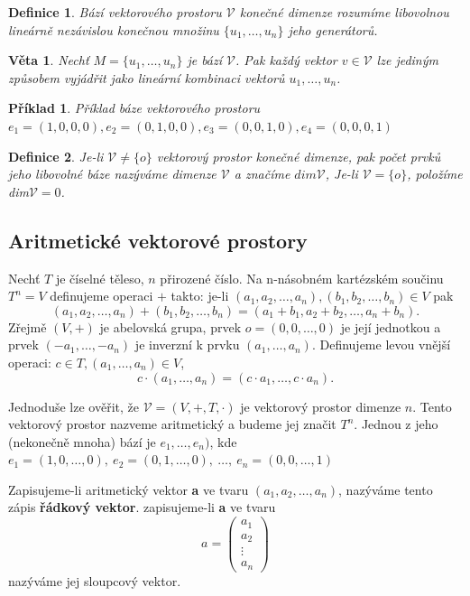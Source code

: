 \documentclass[12pt,a4paper]{article}
\newtheorem{definition}{Definice}
\newtheorem{sentence}{Věta}
\newtheorem{example}{Příklad}
\begin{document}
\begin{definition}
	Bází vektorového prostoru $\mathscr{V}$ konečné dimenze rozumíme libovolnou lineárně nezávislou konečnou množinu $\{u_1, \dots, u_n\}$ jeho generátorů.
\end{definition}

\begin{sentence}
	Nechť $M = \{u_1, \dots, u_n\}$ je bází $\mathscr{V}$. Pak každý vektor $v \in \mathscr{V}$ lze jediným způsobem vyjádřit jako lineární kombinaci vektorů $u_1, \dots, u_n$.
\end{sentence}

\begin{example}
	Příklad báze vektorového prostoru $e_1 = (1,0,0,0), e_2 = (0,1,0,0), e_3 = (0,0,1,0), e_4 = (0,0,0,1)$
\end{example}

\begin{definition}
	Je-li $\mathscr{V} \not= \{o\}$  vektorový prostor konečné dimenze, pak počet prvků jeho libovolné báze nazýváme dimenze $\mathscr{V}$ a značíme $dim\mathscr{V}$, Je-li $\mathscr{V} = \{o\}$, položíme dim$\mathscr{V} = 0$.
\end{definition}


\subsection{Aritmetické vektorové prostory}
Nechť $T$ je číselné těleso, $n$ přirozené číslo. Na n-násobném kartézském součinu $T^n = V$ definujeme operaci $+$ takto: je-li $(a_1,a_2,\dots, a_n), (b_1,b_2,\dots, b_n) \in V$ pak $$(a_1,a_2,\dots, a_n) +(b_1,b_2,\dots, b_n) = (a_1 + b_1, a_2 + b_2,\dots, a_n + b_n).$$
Zřejmě $(V, +)$ je abelovská grupa, prvek $o = (0,0, \dots, 0)$ je její jednotkou a prvek $(- a_1, \dots, - a_n)$ je inverzní k prvku $(a_1, \dots, a_n)$. Definujeme levou vnější operaci: $c \in T, (a_1, \dots, a_n) \in V$, $$c \cdot (a_1,\dots, a_n) = (c \cdot a_1,\dots,c \cdot a_n).$$

Jednoduše lze ověřit, že $\mathscr{V} = (V,+,T,\cdot)$ je vektorový prostor dimenze $n$. Tento vektorový prostor nazveme aritmetický a budeme jej značit $T^n$. Jednou z jeho (nekonečně mnoha) bází je $e_1, \dots, e_n)$, kde $e_1 = (1,0,\dots, 0),\ e_2 = (0,1,\dots, 0),\ \dots, \ e_n = (0,0,\dots, 1)$ 

Zapisujeme-li aritmetický vektor \textbf{a} ve tvaru $(a_1,a_2, \dots, a_n)$, nazýváme tento zápis \textbf{řádkový vektor}. zapisujeme-li \textbf{a} ve tvaru 
\begin{displaymath}
	a = \left( 
	 \begin{array}{c}
		a_1\\ a_2 \\ \vdots \\ a_n
	\end{array}\right)
\end{displaymath}
nazýváme jej sloupcový vektor.
\end{document}
